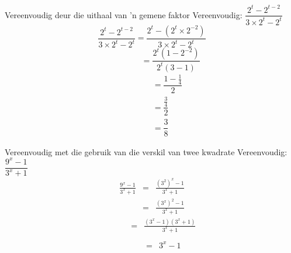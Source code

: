 \begin{wex}{Vereenvoudig deur die uithaal van 'n gemene faktor}
{Vereenvoudig: $\dfrac{2^t-2^{t-2}}{3 \times 2^t - 2^t}$}
{
\begin{equation*}
  \dfrac{2^t-2^{t-2}}{3 \times 2^t-2^t} =
  \dfrac{2^t-(2^t \times 2^{-2})}{3 \times 2^t - 2^t}
\end{equation*}
\begin{equation*}
  \phantom{\frac{2^t-2^{t-2}}{3 \times 2^t-2^t}} = \frac{2^t(1-2^{-2})}{2^t(3-1)}
\end{equation*}
\begin{align*}
  \phantom{\frac{2^t-2^{t-2}}{3.2^t-2^t}}
  &= \dfrac{1- \frac{1}{4}}{2} \\
  &= \dfrac{\frac{3}{4}}{2} \\
  &= \dfrac{3}{8} 
\end{align*}
} 
\end{wex}

\clearpage
\begin{wex}
{Vereenvoudig met die gebruik van die verskil van twee kwadrate}
{Vereenvoudig: $\dfrac{9^x-1}{3^x+1}$}
{
\begin{eqnarray*}
 \frac{9^x-1}{3^x+1} & = & \frac{(3^2)^x -1}{3^x+1} \\
		     & = & \frac{(3^x)^2-1}{3^x+1} 
\end{eqnarray*}
\begin{eqnarray*}
 \phantom{\frac{9^x-1}{3^x+1}} & = & \frac{(3^x-1)(3^x+1)}{3^x+1}\\
\end{eqnarray*}
\begin{eqnarray*}
 \phantom{\frac{9^x-1}{3^x+1}} & = & 3^x-1\\
\end{eqnarray*}
}
\end{wex}


